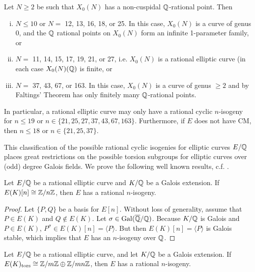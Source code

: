 \begin{thm} \label{thm:isogenyclassification}
Let $N \geq 2$ be such that $X_0(N)$ has a non-cuspidal $\mathbb{Q}$-rational point. Then
	\begin{enumerate}[(i)]
	\item $N \leq 10$ or $N=$ 12, 13, 16, 18, or 25. In this case, $X_0(N)$ is a curve of genus 0, and the $\mathbb{Q}$ rational points on $X_0(N)$ form an infinite 1-parameter family, or
	\item $N=$ 11, 14, 15, 17, 19, 21, or 27, i.e. $X_0(N)$ is a rational elliptic curve (in each case $X_0(N)(\mathbb{Q})$ is finite, or
	\item $N=$ 37, 43, 67, or 163. In this case, $X_0(N)$ is a curve of genus $\geq 2$ and by Faltings' Theorem has only finitely many $\mathbb{Q}$-rational points. 
	\end{enumerate}
In particular, a rational elliptic curve may only have a rational cyclic $n$-isogeny for $n \leq 19$ or $n \in \{ 21, 25, 27, 37, 43, 67,163\}$. Furthermore, if $E$ does not have CM, then $n \leq 18$ or $n \in \{ 21, 25, 37 \}$.
\end{thm}


This classification of the possible rational cyclic isogenies for elliptic curves $E/\mathbb{Q}$ places great restrictions on the possible torsion subgroups for elliptic curves over (odd) degree Galois fields. We prove the following well known results, c.f. \cite{najman16,chou16,gonzalezjimenez17,chou19}. 


\begin{lem} \label{lem:galoisisogeny}
Let $E/\mathbb{Q}$ be a rational elliptic curve and $K/\mathbb{Q}$ be a Galois extension. If $E(K)[n] \cong \mathbb{Z}/n\mathbb{Z}$, then $E$ has a rational $n$-isogeny. 
\end{lem}

\begin{proof} 
Let $\{ P, Q \}$ be a basis for $E[n]$. Without loss of generality, assume that $P \in E(K)$ and $Q \notin E(K)$. Let $\sigma \in \operatorname{Gal}(\overline{\mathbb{Q}}/\mathbb{Q})$. Because $K/\mathbb{Q}$ is Galois and $P \in E(K)$, $P^\sigma \in E(K)[n]= \langle P \rangle$. But then $E(K)[n]= \langle P \rangle$ is Galois stable, which implies that $E$ has an $n$-isogeny over $\mathbb{Q}$.
\end{proof}


\begin{lem} \label{lem:galoisisogeny2}
Let $E/\mathbb{Q}$ be a rational elliptic curve, and let $K/\mathbb{Q}$ be a Galois extension. If $E(K)_{\text{tors}} \cong \mathbb{Z}/m\mathbb{Z} \oplus \mathbb{Z}/mn\mathbb{Z}$, then $E$ has a rational $n$-isogeny. 
\end{lem}

